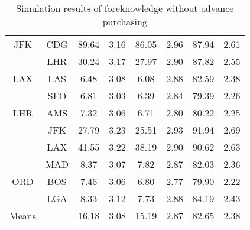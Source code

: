 \begin{table}
\begin{center}
\begin{tabular}{c c | c c | c c | c | c }
JFK  &  CDG  &   89.64  &  3.16  &   86.05  &  2.96  &  87.94  &  2.61 \\
~    &  LHR  &   30.24  &  3.17  &   27.97  &  2.90  &  87.82  &  2.55 \\[.5ex]
LAX  &  LAS  &    6.48  &  3.08  &    6.08  &  2.88  &  82.59  &  2.38 \\
~    &  SFO  &    6.81  &  3.03  &    6.39  &  2.84  &  79.39  &  2.26 \\[.5ex]
LHR  &  AMS  &    7.32  &  3.06  &    6.71  &  2.80  &  80.22  &  2.25 \\
~    &  JFK  &   27.79  &  3.23  &   25.51  &  2.93  &  91.94  &  2.69 \\
~    &  LAX  &   41.55  &  3.22  &   38.19  &  2.90  &  90.62  &  2.63 \\
~    &  MAD  &    8.37  &  3.07  &    7.82  &  2.87  &  82.03  &  2.36 \\[.5ex]
ORD  &  BOS  &    7.46  &  3.06  &    6.80  &  2.77  &  79.90  &  2.22 \\
~    &  LGA  &    8.33  &  3.12  &    7.73  &  2.88  &  84.19  &  2.43 \\
\midrule
Means &  ~   &   16.18  &  3.08  &   15.19  &  2.87  &  82.65  &  2.38 \\
    \bottomrule
\end{tabular}
\caption{Simulation results of foreknowledge without advance purchasing}
\label{tbl:resultsSecond}
\end{center}
\end{table}



